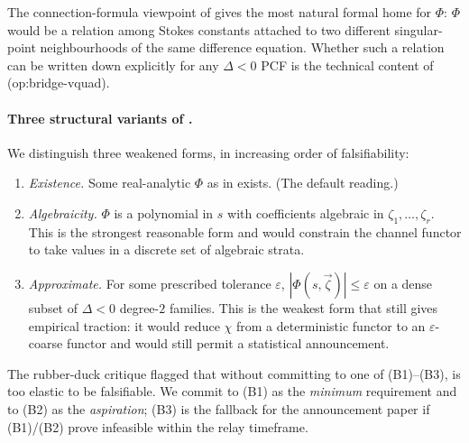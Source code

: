 \documentclass[11pt,reqno]{amsart}
\theoremstyle{plain}
\theoremstyle{definition}
\theoremstyle{remark}
\begin{document}
The connection-formula viewpoint of
\cite{costincostin2001formation} gives the most natural
formal home for $\Phi$: $\Phi$ would be a relation among
Stokes constants attached to two different singular-point
neighbourhoods of the same difference equation. Whether such
a relation can be written down explicitly for any $\Delta<0$
PCF is the technical content of (op:bridge-vquad).

\paragraph{Three structural variants of .}
We distinguish three weakened forms, in increasing order of
falsifiability:
\begin{enumerate}[label=(B\arabic*)]
\item \emph{Existence.} Some real-analytic $\Phi$ as in
 exists. (The default reading.)
\item \emph{Algebraicity.} $\Phi$ is a polynomial in $s$ with
coefficients algebraic in $\zeta_1, \ldots, \zeta_r$. This
is the strongest reasonable form and would constrain the
channel functor to take values in a discrete set of
algebraic strata.
\item \emph{Approximate.} For some prescribed tolerance
$\varepsilon$, $|\Phi(s, \vec\zeta)| \le \varepsilon$ on a
dense subset of $\Delta < 0$ degree-$2$ families. This is
the weakest form that still gives empirical traction: it
would reduce $\chi$ from a deterministic functor to an
$\varepsilon$-coarse functor and would still permit a
statistical announcement.
\end{enumerate}
The rubber-duck critique flagged that without committing
to one of (B1)--(B3),  is too elastic to
be falsifiable. We commit to (B1) as the \emph{minimum}
requirement and to (B2) as the \emph{aspiration}; (B3) is the
fallback for the announcement paper if (B1)/(B2) prove
infeasible within the relay timeframe.
\end{document}
